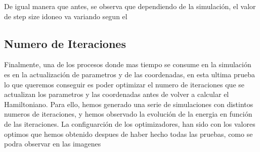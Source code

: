 
De igual manera que antes, se observa que dependiendo de la simulación, el valor de step size idoneo va variando segun el 


\subsection{Numero de Iteraciones}

Finalmente, una de los procesos donde mas tiempo se consume en la simulación es en la actualización de parametros y de las coordenadas, en esta ultima prueba lo que queremos conseguir es poder optimizar el numero de iteraciones que se actualizan los parametros y las coordenadas antes de volver a calcular el Hamiltoniano. Para ello, hemos generado una serie de simulaciones con distintos numeros de iteraciones, y hemos observado la evolución de la energia en función de las iteraciones. La configuarción de los optimizadores, han sido con los valores optimos que hemos obtenido despues de haber hecho todas las pruebas, como se podra observar en las imagenes 